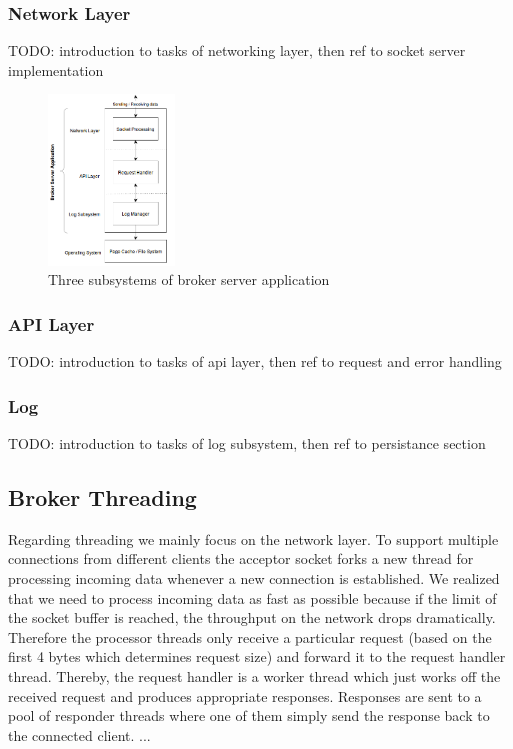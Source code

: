 \subsubsection{Network Layer}

TODO: introduction to tasks of networking layer, then ref to socket server implementation

\begin{figure}[H]
    \centering
    \includegraphics[width=0.3\textwidth]{images/design-subsystems.png}
    \caption{Three subsystems of broker server application}
    \label{fig:architecture-subsystems.png}
\end{figure}

\subsubsection{API Layer}

TODO: introduction to tasks of api layer, then ref to request and error handling

\subsubsection{Log}

TODO: introduction to tasks of log subsystem, then ref to persistance section


\subsection{Broker Threading}
Regarding threading we mainly focus on the network layer. To support multiple
connections from different clients the acceptor socket forks a new thread for
processing incoming data whenever a new connection is established. We realized
that we need to process incoming data as fast as possible because if the limit
of the socket buffer is reached, the throughput on the network drops
dramatically. Therefore the processor threads only receive a
particular request (based on the first 4 bytes which determines request size)
and forward it to the request handler thread. Thereby, the request handler is a worker
thread which just works off the received request and produces appropriate
responses. Responses are sent to a pool of responder threads where one of them simply send the
response back to the connected client.
...

